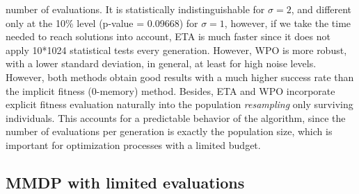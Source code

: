 \documentclass{svmult}
\begin{document}
number of evaluations. It is statistically indistinguishable for
$\sigma=2$, and different only at the 10\% level (p-value = 0.09668)
for $\sigma=1$, however, if we take the time needed to reach solutions
into account, ETA is much faster since it does not apply 10*1024
statistical tests every generation. 
However, WPO is more robust, with
a lower standard deviation, in general, at least for high noise
levels. However, both methods obtain good results with a much higher
success rate than the implicit fitness (0-memory) method. Besides, ETA and WPO 
incorporate explicit fitness evaluation naturally into the population
{\em resampling} only surviving individuals. This accounts for a
predictable behavior of the algorithm, since the number of evaluations
per generation is exactly the population size, which is important for
optimization processes with a limited budget. 

\subsection{MMDP with limited evaluations}
\label{ss:lted}
\end{document}
